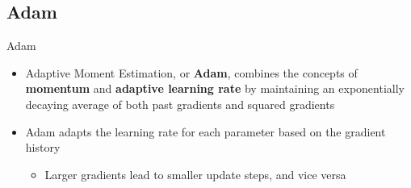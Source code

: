 \documentclass[serif, aspectratio=169]{beamer}
\begin{document}

\subsection{Adam}
\begin{frame}{Adam}
    \begin{itemize}
        \item Adaptive Moment Estimation, or \textbf{Adam}, combines the concepts of \textbf{momentum} and \textbf{adaptive learning rate} by maintaining an exponentially decaying average of both past gradients and squared gradients
        \item Adam adapts the learning rate for each parameter based on the gradient history
        \begin{itemize}
            \item Larger gradients lead to smaller update steps, and vice versa
        \end{itemize}
    \end{itemize}
\end{frame}
\end{document}
